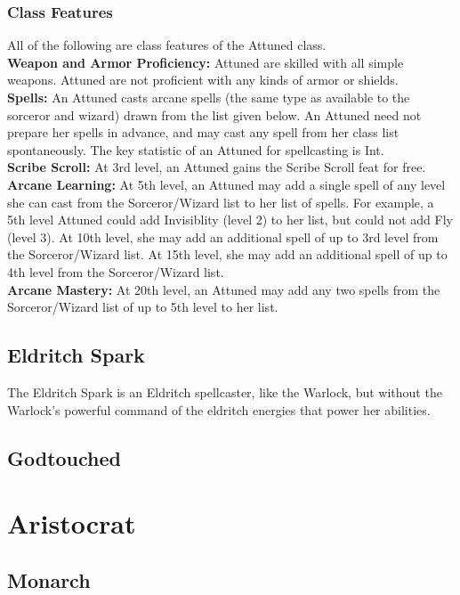 \documentclass[11pt]{report}
\begin{document}
\subsubsection{Class Features}
All of the following are class features of the Attuned class. \\
\textbf{Weapon and Armor Proficiency:} Attuned are skilled with all simple
weapons. Attuned are not proficient with any kinds of armor or shields. \\
\textbf{Spells:} An Attuned casts arcane spells (the same type as available to
the sorceror and wizard) drawn from the list given below. An Attuned need not
prepare her spells in advance, and may cast any spell from her class list
spontaneously. The key statistic of an Attuned for spellcasting is Int. \\
\textbf{Scribe Scroll:} At 3rd level, an Attuned gains the Scribe Scroll feat
for free. \\
\textbf{Arcane Learning:} At 5th level, an Attuned may add a single spell of any
level she can cast from the Sorceror/Wizard list to her list of spells. For
example, a 5th level Attuned could add Invisiblity (level 2) to her list, but could not
add Fly (level 3). At 10th level, she may add an additional spell of up to 3rd
level from the Sorceror/Wizard list. At 15th level, she may add an additional
spell of up to 4th level from the Sorceror/Wizard list. \\
\textbf{Arcane Mastery:} At 20th level, an Attuned may add any two spells from
the Sorceror/Wizard list of up to 5th level to her list.

\subsection{Eldritch Spark}
The Eldritch Spark is an Eldritch spellcaster, like the Warlock, but without the
Warlock's powerful command of the eldritch energies that power her abilities.
\subsection{Godtouched}

\section{Aristocrat}
\subsection{Monarch}
\end{document}
